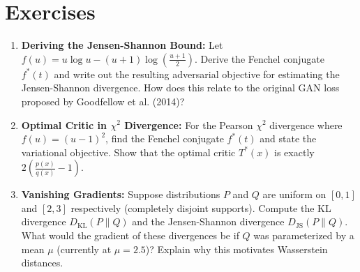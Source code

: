 \section*{Exercises}
\begin{enumerate}
    \item \textbf{Deriving the Jensen-Shannon Bound:} Let $f(u) = u \log u - (u+1) \log\left(\frac{u+1}{2}\right)$. Derive the Fenchel conjugate $f^*(t)$ and write out the resulting adversarial objective for estimating the Jensen-Shannon divergence. How does this relate to the original GAN loss proposed by Goodfellow et al. (2014)?
    \item \textbf{Optimal Critic in $\chi^2$ Divergence:} For the Pearson $\chi^2$ divergence where $f(u) = (u-1)^2$, find the Fenchel conjugate $f^*(t)$ and state the variational objective. Show that the optimal critic $T^*(x)$ is exactly $2\left(\frac{p(x)}{q(x)} - 1\right)$. 
    \item \textbf{Vanishing Gradients:} Suppose distributions $P$ and $Q$ are uniform on $[0,1]$ and $[2,3]$ respectively (completely disjoint supports). Compute the KL divergence $D_{\text{KL}}(P \parallel Q)$ and the Jensen-Shannon divergence $D_{\text{JS}}(P \parallel Q)$. What would the gradient of these divergences be if $Q$ was parameterized by a mean $\mu$ (currently at $\mu=2.5$)? Explain why this motivates Wasserstein distances.
\end{enumerate}

